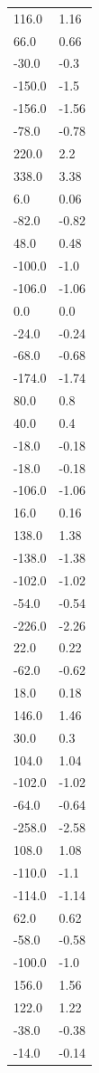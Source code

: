 \begin{longtable}{ll}
116.0 & 1.16 \\
66.0 & 0.66 \\
-30.0 & -0.3 \\
-150.0 & -1.5 \\
-156.0 & -1.56 \\
-78.0 & -0.78 \\
220.0 & 2.2 \\
338.0 & 3.38 \\
6.0 & 0.06 \\
-82.0 & -0.82 \\
48.0 & 0.48 \\
-100.0 & -1.0 \\
-106.0 & -1.06 \\
0.0 & 0.0 \\
-24.0 & -0.24 \\
-68.0 & -0.68 \\
-174.0 & -1.74 \\
80.0 & 0.8 \\
40.0 & 0.4 \\
-18.0 & -0.18 \\
-18.0 & -0.18 \\
-106.0 & -1.06 \\
16.0 & 0.16 \\
138.0 & 1.38 \\
-138.0 & -1.38 \\
-102.0 & -1.02 \\
-54.0 & -0.54 \\
-226.0 & -2.26 \\
22.0 & 0.22 \\
-62.0 & -0.62 \\
18.0 & 0.18 \\
146.0 & 1.46 \\
30.0 & 0.3 \\
104.0 & 1.04 \\
-102.0 & -1.02 \\
-64.0 & -0.64 \\
-258.0 & -2.58 \\
108.0 & 1.08 \\
-110.0 & -1.1 \\
-114.0 & -1.14 \\
62.0 & 0.62 \\
-58.0 & -0.58 \\
-100.0 & -1.0 \\
156.0 & 1.56 \\
122.0 & 1.22 \\
-38.0 & -0.38 \\
-14.0 & -0.14 \\

\end{longtable}
